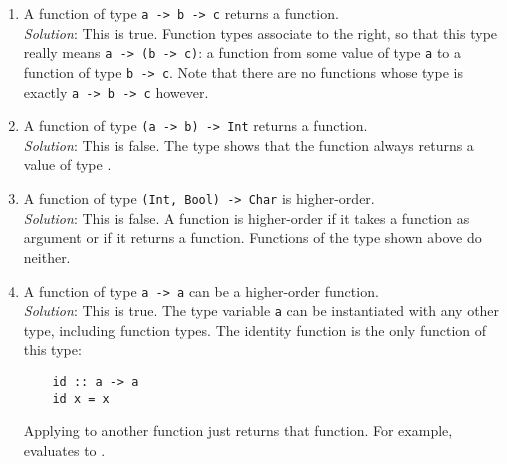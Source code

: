 \begin{enumerate}
	\item A function of type \texttt{\small a -> b -> c} returns a function. \\
	\emph{Solution}: This is true. Function types associate to the right, so that this type really means \texttt{\small a -> (b -> c)}: a function from some value of type \texttt{\small a} to a function of type \texttt{\small b -> c}. Note that there are no functions whose type is exactly \texttt{\small a -> b -> c} however.
	\item A function of type \texttt{\small (a -> b) -> Int} returns a function. \\
	\emph{Solution}: This is false. The type shows that the function always returns a value of type .
	\item A function of type \texttt{\small (Int, Bool) -> Char} is higher-order. \\
	\emph{Solution}: This is false. A function is higher-order if it takes a function as argument or if it returns a function. Functions of the type shown above do neither.
	\item A function of type \texttt{\small a -> a} can be a higher-order function.\\
	\emph{Solution}: This is true. The type variable \texttt{\small a} can be instantiated with any other type, including function types. The identity function  is the only function of this type:
	\begin{verbatim}
	id :: a -> a
	id x = x
	\end{verbatim}
	Applying  to another function just returns that function. For example,  evaluates to .
\end{enumerate}

\taskLine